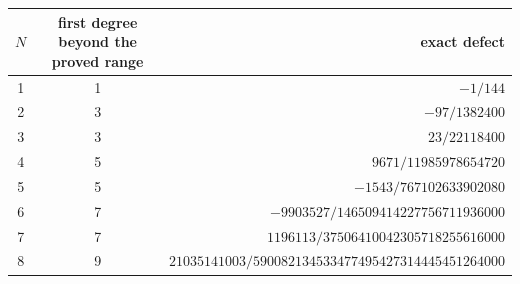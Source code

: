 \begingroup
\renewcommand{\arraystretch}{1.25}
\begin{tabular}{c c r}
\toprule
$N$ & first degree beyond the proved range & exact defect \\
\midrule
1 & 1 & ${-1}/{144}$ \\
2 & 3 & ${-97}/{1382400}$ \\
3 & 3 & ${23}/{22118400}$ \\
4 & 5 & ${9671}/{11985978654720}$ \\
5 & 5 & ${-1543}/{767102633902080}$ \\
6 & 7 & ${-9903527}/{146509414227756711936000}$ \\
7 & 7 & ${1196113}/{37506410042305718255616000}$ \\
8 & 9 & ${21035141003}/{590082134533477495427314445451264000}$ \\
\bottomrule
\end{tabular}
\endgroup
